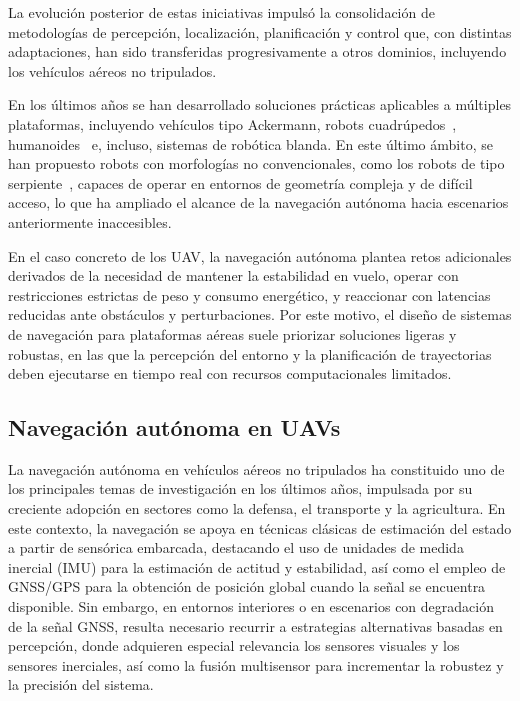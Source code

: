    La evolución posterior de estas iniciativas impulsó la consolidación de metodologías de percepción, localización, planificación y control 
    que, con distintas adaptaciones, han sido transferidas progresivamente a otros dominios, incluyendo los vehículos aéreos no tripulados.

    En los últimos años se han desarrollado soluciones prácticas aplicables a múltiples plataformas, incluyendo vehículos tipo Ackermann, 
    robots cuadrúpedos~\cite{spot-boston}, humanoides~\cite{atlas-boston} e, incluso, sistemas de robótica blanda. En este último ámbito, se 
    han propuesto robots con morfologías no convencionales, como los robots de tipo serpiente~\cite{snake-like-robot}, capaces de operar en 
    entornos de geometría compleja y de difícil acceso, lo que ha ampliado el alcance de la navegación autónoma hacia escenarios anteriormente 
    inaccesibles.

    En el caso concreto de los UAV, la navegación autónoma plantea retos adicionales derivados de la necesidad de mantener la estabilidad en 
    vuelo, operar con restricciones estrictas de peso y consumo energético, y reaccionar con latencias reducidas ante obstáculos y 
    perturbaciones. Por este motivo, el diseño de sistemas de navegación para plataformas aéreas suele priorizar soluciones ligeras y robustas, 
    en las que la percepción del entorno y la planificación de trayectorias deben ejecutarse en tiempo real con recursos computacionales 
    limitados.


\subsection{Navegación autónoma en UAVs}

    La navegación autónoma en vehículos aéreos no tripulados ha constituido uno de los principales temas de investigación en los últimos años, 
    impulsada por su creciente adopción en sectores como la defensa, el transporte y la agricultura. En este contexto, la navegación se apoya 
    en técnicas clásicas de estimación del estado a partir de sensórica embarcada, destacando el uso de unidades de medida inercial (IMU) para 
    la estimación de actitud y estabilidad, así como el empleo de GNSS/GPS para la obtención de posición global cuando la señal se encuentra 
    disponible. Sin embargo, en entornos interiores o en escenarios con degradación de la señal GNSS, resulta necesario recurrir a estrategias 
    alternativas basadas en percepción, donde adquieren especial relevancia los sensores visuales y los sensores inerciales, así como la 
    fusión multisensor para incrementar la robustez y la precisión del sistema.

